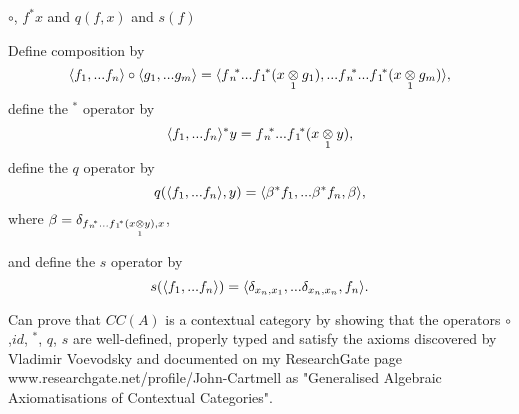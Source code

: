 \begin{frame}{$\circ$, $f^*x$ and $q(f,x)$ and $s(f)$}
\newcommand{\pullbackobject}{\fnvectorstar(\crossx{x}{y}{1})}
\newcommand{\deltaterm}{\delta_{\pullbackobject,x}}

Define composition by
\begin{equation} 
\tuple{f_1,...f_n}\circ \tuple{g_1,...g_m} 
=\tuple{\fnvectorstar(\crossx{x}{g_1}{1}),...\fnvectorstar(\crossx{x}{g_m}{1})},
\end{equation}
define the $^*$ operator by
\begin{equation} 
\tuple{\fn}^*y=\pullbackobject,
\end{equation}
define the $q$ operator by
\begin{equation} 
q(\tuple{\fn},y)=
\tuple{{\beta}^*f_1,...{\beta}^*f_n,\beta},
\end{equation}
where 
$\beta = \deltaterm$,

and define the $s$ operator by 
\begin{equation} 
s(\tuple{\fn})=\tuple{\delta_{x_n,x_1},...\delta_{x_n,x_n},f_n}.
\end{equation}

Can prove that $CC(A)$ is a contextual category by showing that the operators
$\circ$,$id$, $^*$, $q$, $s$ are well-defined, properly typed and satisfy the axioms discovered by Vladimir Voevodsky and documented on my ResearchGate page
www.researchgate.net/profile/John-Cartmell
as 
"Generalised Algebraic Axiomatisations of Contextual Categories".
\end{frame}


